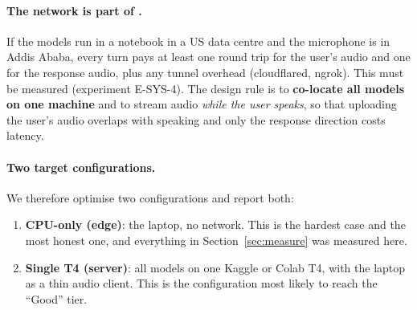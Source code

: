 \paragraph{The network is part of \ttfa.} If the models run in a notebook in a US data centre and the
microphone is in Addis Ababa, every turn pays at least one round trip for the user's audio and one
for the response audio, plus any tunnel overhead (cloudflared, ngrok). This must be measured
(experiment E-SYS-4). The design rule is to \textbf{co-locate all models on one machine} and to stream
audio \emph{while the user speaks}, so that uploading the user's audio overlaps with speaking and
only the response direction costs latency.

\paragraph{Two target configurations.} We therefore optimise two configurations and report both:
\begin{enumerate}
  \item \textbf{CPU-only (edge)}: the laptop, no network. This is the hardest case and the most honest one,
  and everything in Section~\ref{sec:measure} was measured here.
  \item \textbf{Single T4 (server)}: all models on one Kaggle or Colab T4, with the laptop as a thin
  audio client. This is the configuration most likely to reach the ``Good'' tier.
\end{enumerate}
